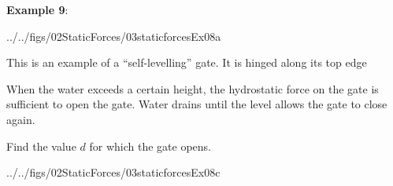 \documentclass[10pt,onesided]{amsart}
\begin{document}
\newpage



\begin{minipage}[t]{0.4\textwidth}
	\textbf{Example 9}:\\
	\begin{cfig}[0.75]{../../figs/02StaticForces/03staticforcesEx08a}\end{cfig}
	\raggedright
	This is an example of a ``self-levelling'' gate. It is hinged along its top edge \par\bigskip
	When the water exceeds a certain height, the hydrostatic force on the gate is sufficient to
	open the gate. Water drains until the level allows the gate to close again. \par\bigskip
	Find the value $d$ for which the gate opens.
	\par\bigskip
	\begin{cfig}[0.9]{../../figs/02StaticForces/03staticforcesEx08c}\end{cfig}
\end{minipage}
\hfill
\end{document}
